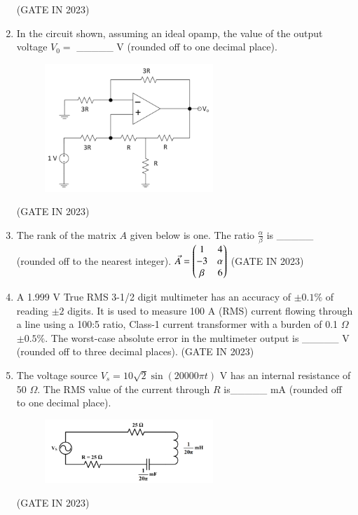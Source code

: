 \documentclass[journal]{IEEEtran}
\begin{document}
\begin{enumerate}
\begin{figure}[H]
      \caption{}
    \label{fig:fig31} 
\end{figure}
\hfill(GATE IN 2023)
    \item In the circuit shown, assuming an ideal opamp, the value of the output voltage $V_0 =$ \_\_\_\_\_ V (rounded off to one decimal place).
    \begin{figure}[H]
    \centering
      \includegraphics[width=0.6\textwidth]{32.png} 
      \caption{}
    \label{fig:fig32} 
\end{figure}
\hfill(GATE IN 2023)
    \item The rank of the matrix $A$ given below is one. The ratio $\frac{\alpha}{\beta}$ is \_\_\_\_\_ (rounded off to the nearest integer).
    $\Vec{A} = \begin{pmatrix} 1 & 4 \\ -3 & \alpha \\ \beta & 6 \end{pmatrix}$
\hfill(GATE IN 2023)
    \item A 1.999 V True RMS 3-1/2 digit multimeter has an accuracy of $\pm 0.1\%$ of reading $\pm 2$ digits. It is used to measure 100 A (RMS) current flowing through a line using a 100:5 ratio, Class-1 current transformer with a burden of 0.1 $\Omega$ $\pm 0.5\%$. The worst-case absolute error in the multimeter output is \_\_\_\_\_ V (rounded off to three decimal places).
\hfill(GATE IN 2023)
    \item The voltage source $V_s = 10\sqrt{2} \sin(20000\pi t)$ V has an internal resistance of 50 $\Omega$. The RMS value of the current through $R$ is\_\_\_\_\_ mA (rounded off to one decimal place).
    \begin{figure}[H]
    \centering
      \includegraphics[width=0.6\textwidth]{33.png} 
      \caption{}
    \label{fig:fig33} 
\end{figure}
\hfill(GATE IN 2023)
\end{enumerate}
\end{document}
